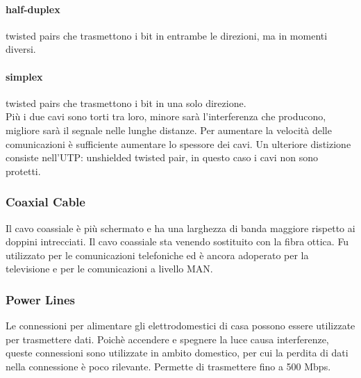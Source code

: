 \documentclass{article}
\begin{document}
\paragraph{half-duplex} twisted pairs che trasmettono i bit in entrambe le
direzioni, ma in momenti diversi. 

\paragraph{simplex} twisted pairs che trasmettono i bit in una solo direzione.\\

Più i due cavi sono torti tra loro, minore sarà l'interferenza che producono, 
migliore sarà il segnale nelle lunghe distanze. Per aumentare la velocità 
delle comunicazioni è sufficiente aumentare lo spessore dei cavi. 
Un ulteriore distizione consiste nell'UTP: unshielded twisted pair, in 
questo caso i cavi non sono protetti.

\subsubsection{Coaxial Cable}
Il cavo coassiale è più schermato e ha una larghezza di banda maggiore rispetto
ai doppini intrecciati. Il cavo coassiale sta venendo sostituito con la fibra
ottica. Fu utilizzato per le comunicazioni telefoniche ed è ancora adoperato per
la televisione e per le comunicazioni a livello MAN.

\subsubsection{Power Lines} 
Le connessioni per alimentare gli elettrodomestici di casa possono essere
utilizzate per trasmettere dati. Poichè accendere e spegnere la luce causa
interferenze, queste connessioni sono utilizzate in ambito domestico, per cui la
perdita di dati nella connessione è poco rilevante. Permette di
trasmettere fino a 500 Mbps.
\end{document}

